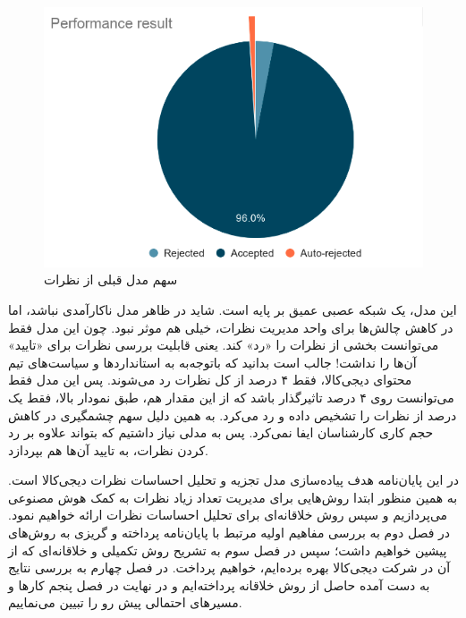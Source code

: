 \begin{figure}[H]
\centering
\includegraphics[width=15cm]{figs/performance_result.png}
\caption{سهم مدل قبلی از نظرات}\label{}
\label{fig:test}
\end{figure}

 این مدل، یک شبکه عصبی عمیق بر پایه
  است. شاید در ظاهر مدل ناکارآمدی نباشد، اما در کاهش چالش‌ها برای واحد مدیریت نظرات، خیلی هم موثر نبود. چون این مدل فقط می‌توانست بخشی از نظرات را «رد» کند. یعنی قابلیت بررسی نظرات برای «تایید»‌ آن‌ها را نداشت!
جالب است بدانید که باتوجه‌به به استانداردها و سیاست‌های تیم محتوای دیجی‌کالا، فقط ۴ درصد از کل نظرات رد می‌شوند. پس این مدل فقط می‌توانست روی ۴ درصد تاثیرگذار باشد که از این مقدار هم، طبق نمودار بالا، فقط یک درصد از نظرات را تشخیص داده و رد می‌کرد. به همین دلیل سهم چشمگیری در کاهش حجم کاری کارشناسان ایفا نمی‌کرد. پس به مدلی نیاز داشتیم که بتواند علاوه بر رد کردن نظرات، به تایید آن‌ها هم بپردازد.


در این پایان‌نامه هدف پیاده‌سازی مدل تجزیه و تحلیل احساسات نظرات دیجی‌کالا است. به همین منظور ابتدا روش‌هایی برای مدیریت تعداد زیاد نظرات به کمک هوش مصنوعی می‌پردازیم و سپس روش خلاقانه‌ای برای تحلیل احساسات نظرات ارائه خواهیم نمود. 
در فصل دوم به بررسی مفاهیم اولیه مرتبط با پایان‌نامه پرداخته و گریزی به روش‌های پیشین خواهیم داشت؛ سپس در فصل سوم به تشریح روش تکمیلی و خلاقانه‌ای که از آن در شرکت دیجی‌کالا بهره برده‌ایم، خواهیم پرداخت. در فصل چهارم به بررسی نتایج به دست آمده حاصل از روش خلاقانه پرداخته‌ایم و در نهایت در فصل پنجم کارها و مسیرهای احتمالی پیش رو را تبیین می‌نماییم.